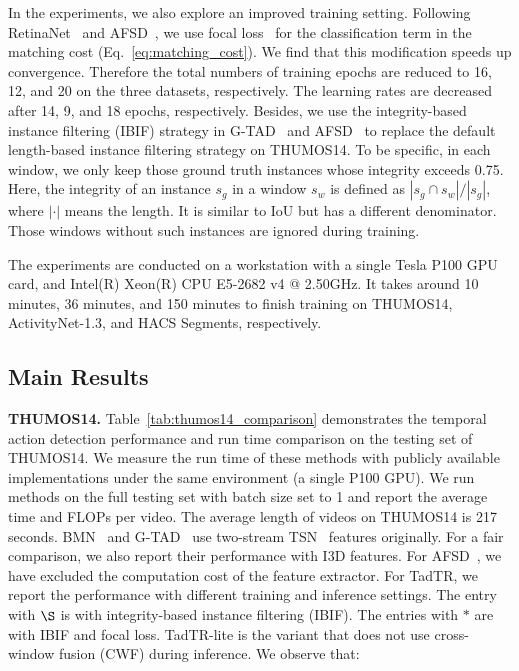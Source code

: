 \documentclass[lettersize,journal]{IEEEtran}
\begin{document}
In the experiments, we also explore an improved training setting. Following RetinaNet~\cite{lin2017focal} and AFSD~\cite{lin2021learning}, we use focal loss~\cite{lin2017focal} for the classification term in the matching cost (Eq.~\ref{eq:matching_cost}). We find that this modification speeds up convergence. Therefore the total numbers of training epochs are reduced to 16, 12, and 20 on the three datasets, respectively. The learning rates are decreased after 14, 9, and 18 epochs, respectively.  Besides, we use the integrity-based instance filtering (IBIF) strategy in G-TAD~\cite{xu2020g} and AFSD~\cite{lin2021learning} to replace the default length-based instance filtering strategy on THUMOS14. To be specific, in each window, we only keep those ground truth instances whose integrity exceeds 0.75. Here, the integrity of an instance $s_g$ in a window $s_w$ is defined as $|s_g \cap s_w|/|s_g|$, where $|\cdot|$ means the length. It is similar to IoU but has a different denominator. Those windows without such instances are ignored during training.

The experiments are conducted on a workstation with a single Tesla P100 GPU card, and Intel(R) Xeon(R) CPU E5-2682 v4 @ 2.50GHz. It takes around 10 minutes, 36 minutes, and 150 minutes to finish training on THUMOS14, ActivityNet-1.3, and HACS Segments, respectively.


\subsection{Main Results}

\noindent\textbf{THUMOS14.} Table~\ref{tab:thumos14_comparison} demonstrates the temporal action detection performance and run time comparison on the testing set of THUMOS14. We measure the run time of these methods with publicly available implementations under the same environment (a single P100 GPU). We run methods on the full testing set with batch size set to 1 and report the average time and FLOPs per video. The average length of videos on THUMOS14 is 217 seconds. BMN~\cite{lin2019bmn} and G-TAD~\cite{xu2020g} use two-stream TSN~\cite{wang2016temporal} features originally. For a fair comparison, we also report their performance with I3D features. For AFSD~\cite{lin2021learning}, we have excluded the computation cost of the feature extractor. For TadTR, we report the performance with different training and inference settings. 
The entry with $\S$ is with integrity-based instance filtering (IBIF). The entries with $*$ are with IBIF and focal loss. TadTR-lite is the variant that does not use cross-window fusion (CWF) during inference.
We observe that:
\end{document}

